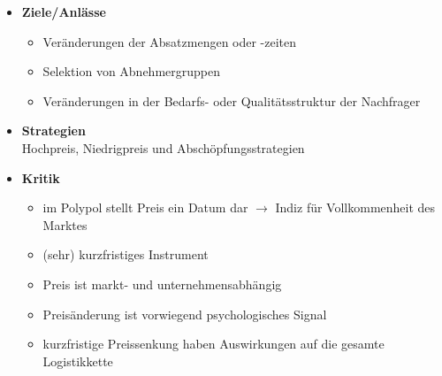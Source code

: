 \documentclass[a4paper,11pt, twoside]{article}
\begin{document}
\begin{itemize}
	\item \textbf{Ziele/Anlässe}
\begin{itemize}
	\item Veränderungen der Absatzmengen oder -zeiten
	\item Selektion von Abnehmergruppen
	\item Veränderungen in der Bedarfs- oder Qualitätsstruktur der Nachfrager 
\end{itemize}

	\item \textbf{Strategien}\\
Hochpreis, Niedrigpreis und Abschöpfungsstrategien

	\item \textbf{Kritik}
\begin{itemize}
	\item im Polypol stellt Preis ein Datum dar $\rightarrow$ Indiz für Vollkommenheit des Marktes
	\item (sehr) kurzfristiges Instrument
	\item Preis ist markt- und unternehmensabhängig 
	\item Preisänderung ist vorwiegend psychologisches Signal
	\item kurzfristige Preissenkung haben Auswirkungen auf die gesamte Logistikkette
\end{itemize}
\end{itemize}
\end{document}
